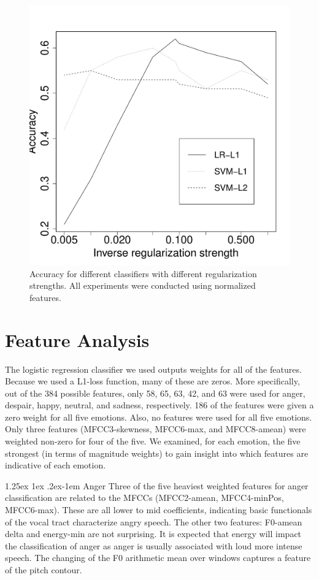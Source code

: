 \documentclass[twocolumn, 11pt]{article}
\makeatletter
\renewcommand{\paragraph}{%
  \@startsection{paragraph}{4}%
  {\z@}{1.25ex \@plus 1ex \@minus .2ex}{-1em}%
  {\normalfont\normalsize\bfseries}%
}
\makeatother
\begin{document}
\begin{figure}[h]\centering
    \includegraphics[width=0.7\columnwidth]{reg_strength.pdf}
    \caption{\label{fig:reg_strength} Accuracy for different classifiers with different regularization strengths. All experiments
    were conducted using normalized features.}
\end{figure}

\section{Feature Analysis}
The logistic regression classifier we used outputs weights for all of the features. Because we used a L1-loss function, many of these are zeros. More specifically, out of the 384 possible features, only 58, 65, 63, 42, and 63 were used for anger, despair, happy, neutral, and sadness, respectively. 186 of the features were given a zero weight for all five emotions. Also, no features were used for all five emotions. Only three features (MFCC3-skewness, MFCC6-max, and MFCC8-amean) were weighted non-zero for four of the five. We examined, for each emotion, the five strongest (in terms of magnitude weights) to gain insight into which features are indicative of each emotion.

\paragraph{Anger} Three of the five heaviest weighted features for anger classification are related to the MFCCs  (MFCC2-amean,  MFCC4-minPos, MFCC6-max). These are all lower to mid coefficients, indicating basic functionals of the vocal tract characterize angry speech. The other two features: F0-amean delta and energy-min are not surprising. It is expected that energy will impact the classification of anger as anger is usually associated with loud more intense speech. The changing of the F0 arithmetic mean over windows captures a feature of the pitch contour.
\end{document}
